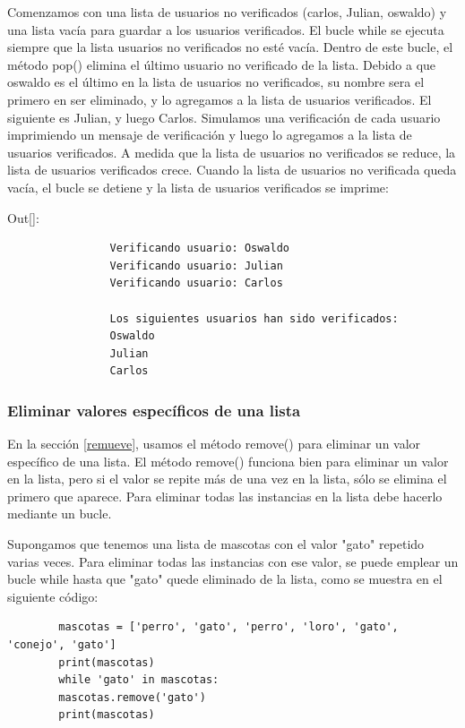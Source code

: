 	
	Comenzamos con una lista de usuarios no verificados (carlos, Julian, oswaldo) y una lista vacía para guardar  a los usuarios verificados. El bucle {\ttfamily while} se ejecuta siempre que la lista usuarios no verificados  no esté vacía. Dentro de este bucle, el método {\ttfamily pop()} elimina el último usuario no verificado de la lista.  Debido a que oswaldo es el último en la lista de usuarios no verificados, su nombre sera el primero en ser eliminado, y lo agregamos a la lista de usuarios verificados.  El siguiente es Julian, y luego Carlos.
	Simulamos una  verificación  de cada usuario imprimiendo un mensaje de verificación y luego lo agregamos  a la lista de usuarios verificados. A medida que la lista de usuarios no verificados se reduce, la lista de usuarios verificados crece. Cuando la lista de usuarios no verificada queda vacía, el bucle se detiene y la lista de usuarios verificados se imprime:\vspace{0.08cm}
	
	{\ttfamily\scriptsize\scriptsize \noindent Out[]: \vspace{-0.3cm}	
		{\color{blue} 	
			\begin{verbatim}
				Verificando usuario: Oswaldo
				Verificando usuario: Julian
				Verificando usuario: Carlos
				
				Los siguientes usuarios han sido verificados:
				Oswaldo
				Julian
				Carlos		
			\end{verbatim}
	}}
	
	
	
	\subsubsection{Eliminar valores específicos de una lista}
	
	En la sección \ref{remueve}, usamos el método {\ttfamily remove()} para eliminar un valor específico de una lista. El método {\ttfamily remove()} funciona bien  para  eliminar un valor en la lista, pero si el valor se repite  más de una vez en la lista,  sólo se elimina el primero que aparece. Para eliminar todas las instancias en la lista debe hacerlo mediante un bucle.
	
	Supongamos que tenemos  una lista de mascotas con el valor {}"{}gato{}"{} repetido varias veces. Para eliminar todas las instancias con  ese valor, se puede emplear un bucle {\ttfamily while} hasta que {}"{}gato{}"{}  quede eliminado de la lista, como se muestra en el siguiente código:
	
	
	\hspace{-2.5cm}{\ttfamily \scriptsize mascotas.py}  \vspace{-0.5cm}
	\begin{lstlisting}		
		mascotas = ['perro', 'gato', 'perro', 'loro', 'gato', 'conejo', 'gato']
		print(mascotas)
		while 'gato' in mascotas:
		mascotas.remove('gato')
		print(mascotas)
	\end{lstlisting}	
	
